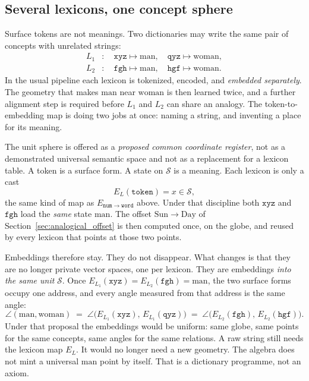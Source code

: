 \documentclass[12pt, a4paper]{article}
\begin{document}
\subsection{Several lexicons, one concept sphere}
\label{subsec:shared_lexicons}
Surface tokens are not meanings. Two dictionaries may write the same
pair of concepts with unrelated strings:
\begin{equation}
    \begin{aligned}
        L_1&: \quad \texttt{xyz}\mapsto\mathrm{man},\quad
                    \texttt{qyz}\mapsto\mathrm{woman},\\
        L_2&: \quad \texttt{fgh}\mapsto\mathrm{man},\quad
                    \texttt{hgf}\mapsto\mathrm{woman}.
    \end{aligned}
    \label{eq:two_lexicons}
\end{equation}
In the usual pipeline each lexicon is tokenized, encoded, and
\emph{embedded separately}. The geometry that makes
$\mathrm{man}$ near $\mathrm{woman}$ is then learned twice, and a
further alignment step is required before $L_1$ and $L_2$ can share
an analogy. The token-to-embedding map is doing two jobs at once:
naming a string, and inventing a place for its meaning.

The unit sphere is offered as a \emph{proposed common coordinate register}, not as a demonstrated universal semantic space and not as a replacement for a lexicon table.
A token is a surface form. A state on $\mathcal{S}$ is a meaning.
Each lexicon is only a cast
\begin{equation}
    E_{L}(\texttt{token}) = x\in\mathcal{S},
    \label{eq:lexicon_cast}
\end{equation}
the same kind of map as $E_{\mathtt{num}\to\mathtt{word}}$ above.
Under that discipline both $\texttt{xyz}$ and $\texttt{fgh}$ load the
\emph{same} state $\mathrm{man}$. The offset
$\mathrm{Sun}\to\mathrm{Day}$ of Section~\ref{sec:analogical_offset}
is then computed once, on the globe, and reused by every lexicon that
points at those two points.

Embeddings therefore stay. They do not disappear.
What changes is that they are no longer private vector spaces, one
per lexicon. They are embeddings \emph{into the same unit}
$\mathcal{S}$. Once $E_{L_1}(\texttt{xyz})=E_{L_2}(\texttt{fgh})=\mathrm{man}$,
the two surface forms occupy one address, and every angle measured
from that address is the same angle:
\begin{equation}
    \angle(\mathrm{man},\mathrm{woman})
    \;=\;
    \angle\bigl(E_{L_1}(\texttt{xyz}),\,E_{L_1}(\texttt{qyz})\bigr)
    \;=\;
    \angle\bigl(E_{L_2}(\texttt{fgh}),\,E_{L_2}(\texttt{hgf})\bigr).
    \label{eq:uniform_angles}
\end{equation}
Under that proposal the embeddings would be uniform: same globe, same points for the same
concepts, same angles for the same relations. A raw string still
needs the lexicon map $E_L$. It would no longer need a new geometry.
The algebra does not mint a universal $\mathrm{man}$ point by itself. That is a dictionary programme, not an axiom.
\end{document}
